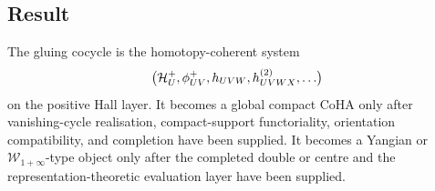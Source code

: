 \subsection*{Result}

The gluing cocycle is the homotopy-coherent system
\[
  \bigl(\mathcal H_U^+,\phi^+_{UV},h_{UVW},h^{(2)}_{UVWX},\ldots\bigr)
\]
on the positive Hall layer. It becomes a global compact CoHA only after
vanishing-cycle realisation, compact-support functoriality, orientation
compatibility, and completion have been supplied. It becomes a Yangian
or \(\mathcal W_{1+\infty}\)-type object only after the completed double
or centre and the representation-theoretic evaluation layer have been
supplied.
